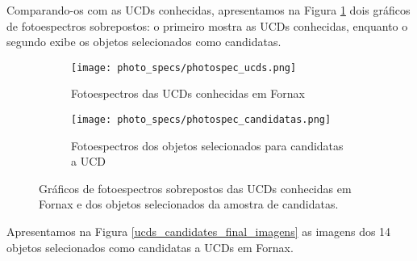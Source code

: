 Comparando-os com as UCDs conhecidas, apresentamos na Figura \ref{ucds_and_candiadates_star_cut_photospec} dois gráficos de fotoespectros sobrepostos: o primeiro mostra as UCDs conhecidas, enquanto o segundo exibe os objetos selecionados como candidatas.

\begin{figure}[!ht]
    \centering
    \captionsetup{justification=centering}
    \begin{subfigure}[b]{0.95\textwidth}
        \texttt{[image: photo\_specs/photospec\_ucds.png]}
        \caption{Fotoespectros das UCDs conhecidas em Fornax}
    \end{subfigure}
    \begin{subfigure}[b]{0.95\textwidth}
        \texttt{[image: photo\_specs/photospec\_candidatas.png]}
        \caption{Fotoespectros dos objetos selecionados para candidatas a UCD}
    \end{subfigure}
    \caption{Gráficos de fotoespectros sobrepostos das UCDs conhecidas em Fornax e dos objetos selecionados da amostra de candidatas.}
    \label{ucds_and_candiadates_star_cut_photospec}
\end{figure}


Apresentamos na Figura \ref{ucds_candidates_final_imagens} as imagens dos 14 objetos selecionados como candidatas a UCDs em Fornax.

